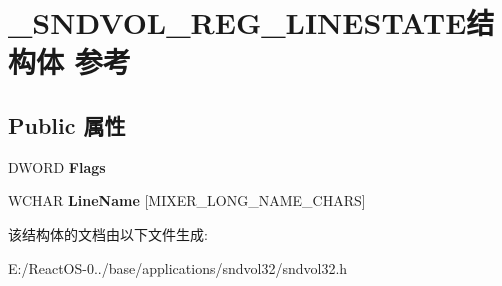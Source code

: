 \hypertarget{struct___s_n_d_v_o_l___r_e_g___l_i_n_e_s_t_a_t_e}{}\section{\+\_\+\+S\+N\+D\+V\+O\+L\+\_\+\+R\+E\+G\+\_\+\+L\+I\+N\+E\+S\+T\+A\+T\+E结构体 参考}
\label{struct___s_n_d_v_o_l___r_e_g___l_i_n_e_s_t_a_t_e}
\subsection*{Public 属性}
\begin{DoxyCompactItemize}
\item 
\mbox{\label{struct___s_n_d_v_o_l___r_e_g___l_i_n_e_s_t_a_t_e_a2e8c2a85c29e28c3f2a867fb64889d93}} 
D\+W\+O\+RD {\bfseries Flags}
\item 
\mbox{\label{struct___s_n_d_v_o_l___r_e_g___l_i_n_e_s_t_a_t_e_a64549c2bcb44457ddb29d876929e0b6a}} 
W\+C\+H\+AR {\bfseries Line\+Name} \mbox{[}M\+I\+X\+E\+R\+\_\+\+L\+O\+N\+G\+\_\+\+N\+A\+M\+E\+\_\+\+C\+H\+A\+RS\mbox{]}
\end{DoxyCompactItemize}


该结构体的文档由以下文件生成\+:\begin{DoxyCompactItemize}
\item 
E\+:/\+React\+O\+S-\/0../base/applications/sndvol32/sndvol32.\+h\end{DoxyCompactItemize}
